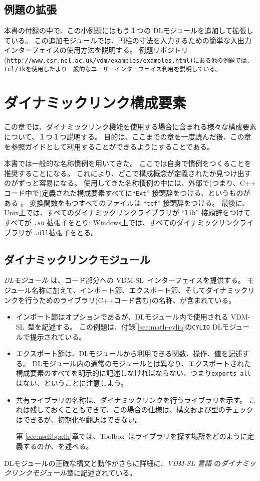 \documentclass[\pformat,12pt]{jarticle}
\newcommand{\vdmslpp}{VDM-SL}
\newcommand{\Toolbox}{Toolbox}
\begin{document}
\subsection*{例題の拡張}

本書の付録の中で、この小例題にはもう１つの DLモジュールを追加して拡張している。
この追加モジュールでは、円柱の寸法を入力するための簡単な入出力インターフェイスの使用方法を説明する。
例題リポジトリ \\(\tt http://www.csr.ncl.ac.uk/vdm/examples/examples.html)にある他の例題では、Tcl/Tkを使用したより一般的なユーザーインターフェイス利用を説明している。
 
\section{ダイナミックリンク構成要素}
\label{sec:dlcomponents}

この章では、ダイナミックリンク機能を使用する場合に含まれる様々な構成要素について、１つ１つ説明する。 
目的は、ここまでの章を一度読んだ後、この章を参照ガイドとして利用することができるようにすることである。

本書では一般的な名称慣例を用いてきた。
ここでは自身で慣例をつくることを推奨することになる。 
これにより、どこで構成概念が定義されたか見つけ出すのがずっと容易になる。 
使用してきた名称慣例の中には、外部で(つまり、C++ コード中で)定義された構成要素すべてに``{\tt Ext}'' 接頭辞をつける、というものがある 。 
変換関数をもつすべてのファイルは ``{\tt tcf}'' 接頭辞をつける。
最後に、Unix上では、すべてのダイナミックリンクライブラリが ``{\tt lib}'' 接頭辞をつけてすべてが {\tt .so} 拡張子をとり;
Windows上では、すべてのダイナミックリンクライブラリが \texttt{.dll}拡張子をとる。

\subsection{ダイナミックリンクモジュール}

 {\em DLモジュール} は、コード部分への \vdmslpp\ インターフェイスを提供する。
モジュール名称に加えて、インポート節、エクスポート節、そしてダイナミックリンクを行うためのライブラリ(C++コード含む)の名称、が含まれている。
\begin{itemize}
\item インポート節はオプションであるが、DLモジュール内で使用される \vdmslpp\ 型を記述する。
この例題は、付録‾\ref{sec:math-cylio}の{\tt CYLIO} DLモジュールで提示されている。
\item エクスポート節は、DLモジュールから利用できる関数、操作、値を記述する。
DLモジュール内の通常のモジュールとは異なり、エクスポートされた構成要素のすべてを明示的に記述しなければならない、つまり{\tt exports all}はない、ということに注意しよう。
\item 共有ライブラリの名称は、ダイナミックリンクを行うライブラリを示す。
これは残しておくこともできて、この場合の仕様は、構文および型のチェックはできるが、初期化や翻訳はできない。
  
  第‾\ref{sec:uselibpath}章では、\Toolbox\ はライブラリを探す場所をどのように定義するのか、を述べる。
\end{itemize}
DLモジュールの正確な構文と動作がさらに詳細に、{\em VDM-SL 言語} \cite{LangMan-CSK}の{\em ダイナミックリンクモジュール}章に記述されている。
\end{document}
